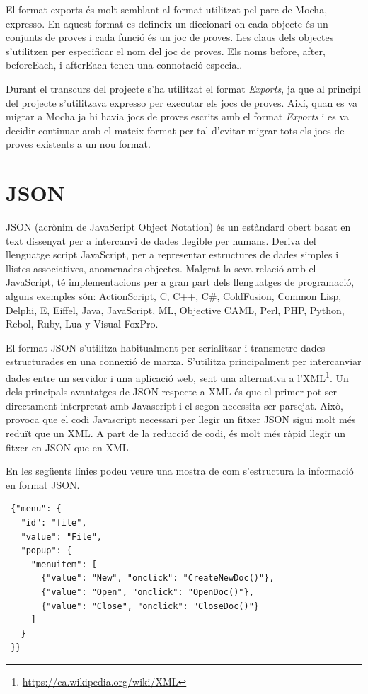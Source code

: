 El format exports és molt semblant al format utilitzat pel pare de Mocha, expresso. En aquest format es defineix un diccionari on cada objecte és un conjunts de proves i cada funció és un joc de proves. Les claus dels objectes s'utilitzen per especificar el nom del joc de proves. Els noms before, after, beforeEach, i afterEach tenen una connotació especial. 

Durant el transcurs del projecte s'ha utilitzat el format \emph{Exports}, ja que al principi del projecte s'utilitzava expresso per executar els jocs de proves. Així, quan es va migrar a Mocha ja hi havia jocs de proves escrits amb el format \emph{Exports} i es va decidir continuar amb el mateix format per tal d'evitar migrar tots els jocs de proves existents a un nou format. 

\section{JSON}
\label{sec:json}

JSON (acrònim de JavaScript Object Notation) és un estàndard obert basat en text dissenyat per a intercanvi de dades llegible per humans. Deriva del llenguatge script JavaScript, per a representar estructures de dades simples i llistes associatives, anomenades objectes. Malgrat la seva relació amb el JavaScript, té implementacions per a gran part dels llenguatges de programació, alguns exemples són: ActionScript, C, C++, C\#, ColdFusion, Common Lisp, Delphi, E, Eiffel, Java, JavaScript, ML, Objective CAML, Perl, PHP, Python, Rebol, Ruby, Lua y Visual FoxPro. 

El format JSON s'utilitza habitualment per serialitzar i transmetre dades estructurades en una connexió de marxa. S'utilitza principalment per intercanviar dades entre un servidor i una aplicació web, sent una alternativa a l'XML\footnote{\url{https://ca.wikipedia.org/wiki/XML}}. Un dels principals avantatges de JSON respecte a XML és que el primer pot ser directament interpretat amb Javascript i el segon necessita ser parsejat. Això, provoca que el codi Javascript necessari per llegir un fitxer JSON sigui molt més reduït que un XML. A part de la reducció de codi, és molt més ràpid llegir un fitxer en JSON que en XML. 

En les següents línies podeu veure una mostra de com s'estructura la informació en format JSON. 

\begin{lstlisting}
 {"menu": {
   "id": "file",
   "value": "File",
   "popup": {
     "menuitem": [
       {"value": "New", "onclick": "CreateNewDoc()"},
       {"value": "Open", "onclick": "OpenDoc()"},
       {"value": "Close", "onclick": "CloseDoc()"}
     ]
   }
 }}
\end{lstlisting}



